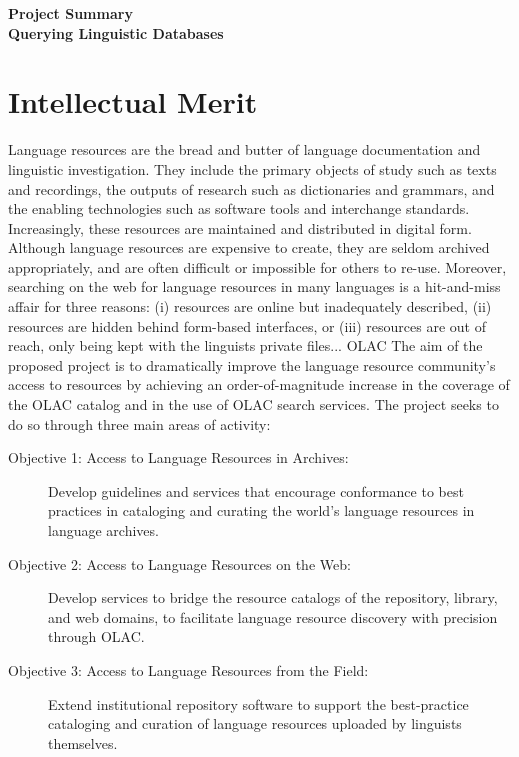 \documentclass[11pt]{nsf}
\begin{document}
\begin{center}\textbf{\Large
Project Summary\\[2ex]
Querying Linguistic Databases
}\end{center}

\section*{Intellectual Merit}

%
%
Language resources are the bread and butter of
language documentation and linguistic investigation.
They include
the primary objects of study such as texts and recordings,
the outputs of research such as dictionaries and grammars,
and the enabling technologies such as software tools and interchange standards.
Increasingly, these resources are maintained and distributed in
digital form.
%
%
Although language resources are expensive to create,
they are seldom archived appropriately,
and are often difficult or impossible for others to re-use.
Moreover, searching on the web for language resources in many languages
is a hit-and-miss affair for three reasons:
(i) resources are online but inadequately described,
(ii) resources are hidden behind form-based interfaces, or
(iii) resources are out of reach, only being kept with the linguists
private files...
%
%
OLAC
%
%
The aim of the proposed project is to dramatically improve the language
resource community's access to resources by achieving an 
order-of-magnitude increase in the coverage of the OLAC catalog
and in the use of OLAC search services.
The project seeks to do so through three main areas of activity:

\begin{description}
  \item[Objective 1: Access to Language Resources in Archives:]
    Develop guidelines and services that encourage conformance to best
    practices in cataloging and curating the world's language resources
    in language archives.

  \item[Objective 2: Access to Language Resources on the Web:]
    Develop services to bridge the resource catalogs of the
    repository, library, and web domains,
    to facilitate language resource discovery with precision through OLAC.

  \item[Objective 3: Access to Language Resources from the Field:]
    Extend institutional repository software to support the
    best-practice cataloging and curation of language resources
    uploaded by linguists themselves.
\end{description}
\end{document}

